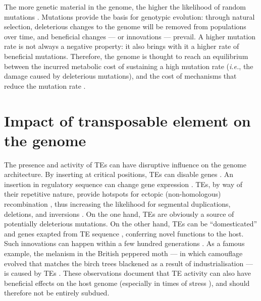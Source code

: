 The more genetic material in the genome, the higher the likelihood of
random mutations \citep{Wielgoss2011}. Mutations provide the basis for
genotypic evolution: through natural selection, deleterious changes to
the genome will be removed from populations over time, and beneficial
changes --- or innovations --- prevail. A higher mutation rate is not
always a negative property: it also brings with it a higher rate of
beneficial mutations. Therefore, the genome is thought to reach an
equilibrium between the incurred metabolic cost of sustaining a high
mutation rate (\emph{i.e.}, the damage caused by deleterious mutations),
and the cost of mechanisms that reduce the mutation rate
\citep{Bernstein1987, Altenberg2011}.

\section{Impact of transposable element on the genome}

The presence and activity of TEs can have disruptive influence on the
genome architecture. By inserting at critical positions, TEs can disable
genes \citep{Kazazian1988}. An insertion in regulatory sequence can
change gene expression \citep{Warnefors2010}. TEs, by way of their
repetitive nature, provide hotspots for ectopic (non-homologous)
recombination \citep{Lim1988, Gray2000, Fiston-Lavier2007}, thus
increasing the likelihood for segmental duplications, deletions, and
inversions \citep{Mathiopoulos1998, Remnant2013}. On the one hand, TEs
are obviously a source of potentially deleterious mutations. On the
other hand, TEs can be ``domesticated'' and genes exapted from TE
sequence \citep{Gahan2001, Daborn2002, Aminetzach2005, Chen2007},
conferring novel functions to the host. Such innovations can happen
within a few hundred generations \citep{Dolgin2006, Struchiner2009,
Kofler2015}. As a famous example, the melanism in the British peppered
moth --- in which camouflage evolved that matches the birch trees
blackened as a result of industrialisation --- is caused by TEs
\citep{Hof2016}. These observations document that TE activity can also
have beneficial effects on the host genome (especially in times of
stress \citep{Chenais2012}), and should therefore not be entirely
subdued.

